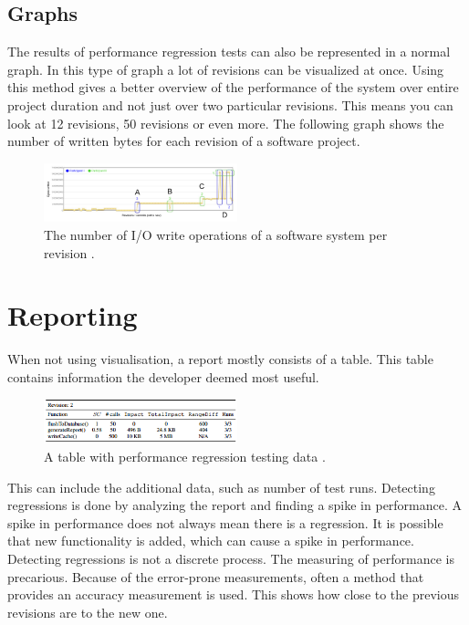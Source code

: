 \subsection{Graphs}
The results of performance regression tests can also be represented in a normal graph. In this type of graph a lot of revisions can be visualized at once. Using this method gives a better overview of the performance of the system over entire project duration and not just over two particular revisions. This means you can look at 12 revisions, 50 revisions or even more. The following graph shows the number of written bytes for each revision of a software project.

\begin{figure}[h]
\begin{center}
  \includegraphics[width=0.5\textwidth]{Figures/bytegraph.png}
\end{center}
  \caption{The number of I/O write operations of a software system per revision \cite{bezemer2014detecting}.}

\end{figure}


\section{Reporting}
When not using visualisation, a report mostly consists of a table. This table contains information the developer deemed most useful.
\begin{figure}[h]
\begin{center}
  \includegraphics[width=0.5\textwidth]{Figures/table.png}
\end{center}
  \caption{A table with performance regression testing data \cite{bezemer2014detecting}.}

\end{figure}

 This can include the additional data, such as number of test runs. Detecting regressions is done by analyzing the report and finding a spike in performance. A spike in performance does not always mean there is a regression. It is possible that new functionality is added, which can cause a spike in performance. Detecting regressions is not a discrete process. The measuring of performance is precarious. Because of the error-prone measurements, often a method that provides an accuracy measurement is used. This shows how close to the previous revisions are to the new one.\\ \\


